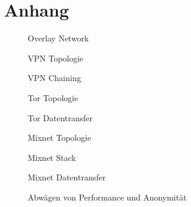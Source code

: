 \section{Anhang}

\begin{figure}[!ht]
    \centering
    
    \caption{Overlay Network}
\end{figure}
\begin{figure}[!ht]
    \centering
    
    \caption{VPN Topologie}
\end{figure}
\begin{figure}[!hb]
    \centering
    
    \caption{VPN Chaining}
\end{figure}
\begin{figure}[!ht]
    \centering
    
    \caption{Tor Topologie}
\end{figure}
\begin{figure}[!hb]
    \centering
    
    \caption{Tor Datentransfer}
\end{figure}
\begin{figure}[!ht]
    \centering
    
    \caption{Mixnet Topologie}
\end{figure}
\begin{figure}[!ht]
    \centering
    
    \caption{Mixnet Stack}
\end{figure}
\begin{figure}[!ht]
    \centering
    
    \caption{Mixnet Datentransfer}
\end{figure}
\begin{figure}[!ht]
    \centering
    
    \caption{Abwägen von Performance und Anonymität}
\end{figure}
